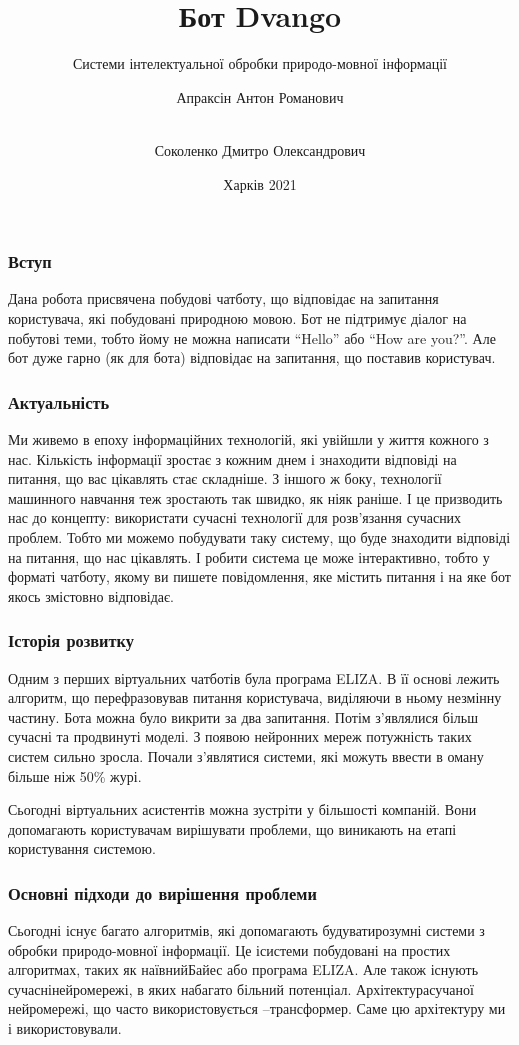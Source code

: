 \documentclass{beamer}
\title{Бот Dvango}
\subtitle{Системи інтелектуальної обробки природо-мовної інформації}
\author[Апраксін, Соколенко]{
    Апраксін Антон Романович
    \and\\
    Соколенко Дмитро Олександрович
}
\institute[ХНУРЕ]{ІТШІ-18-1}
\date{Харків 2021}
\begin{document}
    \frame{\titlepage}

    \begin{frame}
        \frametitle{Вступ}
            Дана робота присвячена побудові чатботу, що відповідає на запитання користувача, які побудовані природною мовою. Бот не підтримує діалог на побутові теми, тобто йому не можна написати ``Hello'' або ``How are you?''. Але бот дуже гарно (як для бота) відповідає на запитання, що поставив користувач.
    \end{frame}

    \begin{frame}
        \frametitle{Актуальність}
    Ми живемо в епоху інформаційних технологій, які увійшли у життя кожного з нас. Кількість інформації зростає з кожним днем і знаходити відповіді на питання, що вас цікавлять стає складніше. З іншого ж боку, технології машинного навчання теж зростають так швидко, як ніяк раніше. І це призводить нас до концепту: використати сучасні технології для розв'язання сучасних проблем. Тобто ми можемо побудувати таку систему, що буде знаходити відповіді на питання, що нас цікавлять. І робити система це може інтерактивно, тобто у форматі чатботу, якому ви пишете повідомлення, яке містить питання і на яке бот якось змістовно відповідає.
    \end{frame}

    \begin{frame}
        \frametitle{Історія розвитку}
        Одним з перших віртуальних чатботів була програма ELIZA. В її основі лежить алгоритм, що перефразовував питання користувача, виділяючи в ньому незмінну частину. Бота можна було викрити за два запитання. Потім з'являлися більш сучасні та продвинуті моделі. З появою нейронних мереж потужність таких систем сильно зросла. Почали з'являтися системи, які можуть ввести в оману більше ніж 50\% журі. 

        Сьогодні віртуальних асистентів можна зустріти у більшості компаній. Вони допомагають користувачам вирішувати проблеми, що виникають на етапі користування системою.
    \end{frame}

    \begin{frame}
        \frametitle{Основні підходи до вирішення проблеми}
        Сьогодні існує багато алгоритмів, які допомагають будуватирозумні системи з обробки природо-мовної інформації. Це ісистеми побудовані на простих алгоритмах, таких як наївнийБайес або програма ELIZA. Але також існують сучаснінейромережі, в яких набагато більний потенціал. Архітектурасучаної нейромережі, що часто використовується –трансформер. Саме цю архітектуру ми і використовували.
    \end{frame}
\end{document}
